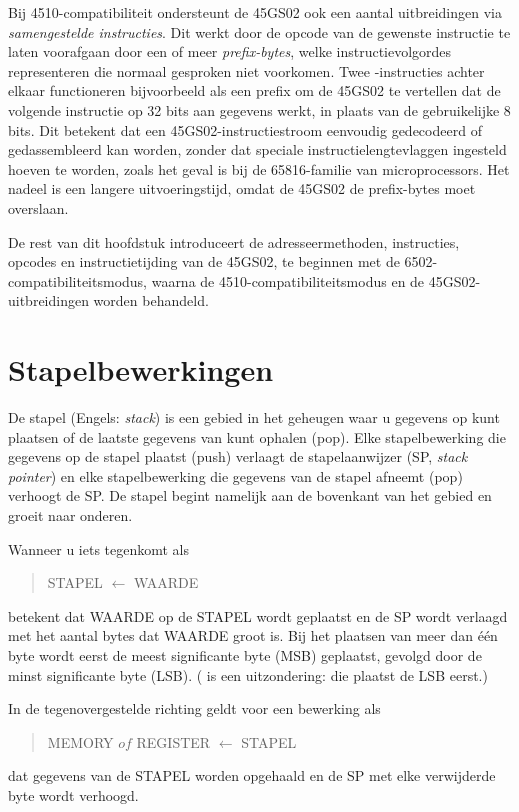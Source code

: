 Bij 4510-compatibiliteit ondersteunt de 45GS02 ook een aantal uitbreidingen via {\em samengestelde instructies}. Dit werkt door de opcode van de gewenste instructie te laten voorafgaan door een of meer {\em prefix-bytes}, welke instructievolgordes representeren die normaal gesproken niet voorkomen. Twee -instructies achter elkaar functioneren bijvoorbeeld als een prefix om de 45GS02 te vertellen dat de volgende instructie op 32 bits aan gegevens werkt, in plaats van de gebruikelijke 8 bits. Dit betekent dat een 45GS02-instructiestroom eenvoudig gedecodeerd of gedassembleerd kan worden, zonder dat speciale instructielengtevlaggen ingesteld hoeven te worden, zoals het geval is bij de 65816-familie van microprocessors. Het nadeel is een langere uitvoeringstijd, omdat de 45GS02 de prefix-bytes moet overslaan.

De rest van dit hoofdstuk introduceert de adresseermethoden, instructies, opcodes en instructietijding van de 45GS02, te beginnen met de 6502-compatibiliteitsmodus, waarna de 4510-compatibiliteitsmodus en de 45GS02-uitbreidingen worden behandeld.

\section{Stapelbewerkingen}

De stapel (Engels: {\em stack}) is een gebied in het geheugen waar u gegevens op kunt plaatsen of de laatste gegevens van kunt ophalen (pop). Elke stapelbewerking die gegevens op de stapel plaatst (push) verlaagt de stapelaanwijzer (SP, {\em stack pointer}) en elke stapelbewerking die gegevens van de stapel afneemt (pop) verhoogt de SP. De stapel begint namelijk aan de bovenkant van het gebied en groeit naar onderen.

Wanneer u iets tegenkomt als
\begin{quote}
  STAPEL $\leftarrow$ WAARDE
\end{quote}
betekent dat WAARDE op de STAPEL wordt geplaatst en de SP wordt verlaagd met het aantal bytes dat WAARDE groot is. Bij het plaatsen van meer dan één byte wordt eerst de meest significante byte (MSB) geplaatst, gevolgd door de minst significante byte (LSB). ( is een uitzondering: die plaatst de LSB eerst.)

In de tegenovergestelde richting geldt voor een bewerking als
\begin{quote}
  MEMORY $of$ REGISTER $\leftarrow$ STAPEL
\end{quote}
dat gegevens van de STAPEL worden opgehaald en de SP met elke verwijderde byte wordt verhoogd.

